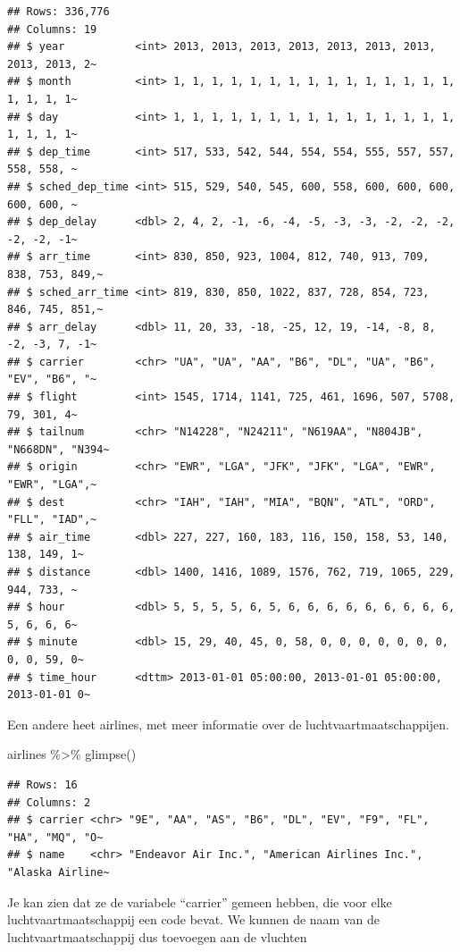 \documentclass[]{tufte-book}
\newenvironment{Shaded}{}{}
\newcommand{\FunctionTok}[1]{\textcolor[rgb]{0.02,0.16,0.49}{#1}}
\newcommand{\NormalTok}[1]{#1}
\newcommand{\SpecialCharTok}[1]{\textcolor[rgb]{0.25,0.44,0.63}{#1}}
\begin{document}
\begin{verbatim}
## Rows: 336,776
## Columns: 19
## $ year           <int> 2013, 2013, 2013, 2013, 2013, 2013, 2013, 2013, 2013, 2~
## $ month          <int> 1, 1, 1, 1, 1, 1, 1, 1, 1, 1, 1, 1, 1, 1, 1, 1, 1, 1, 1~
## $ day            <int> 1, 1, 1, 1, 1, 1, 1, 1, 1, 1, 1, 1, 1, 1, 1, 1, 1, 1, 1~
## $ dep_time       <int> 517, 533, 542, 544, 554, 554, 555, 557, 557, 558, 558, ~
## $ sched_dep_time <int> 515, 529, 540, 545, 600, 558, 600, 600, 600, 600, 600, ~
## $ dep_delay      <dbl> 2, 4, 2, -1, -6, -4, -5, -3, -3, -2, -2, -2, -2, -2, -1~
## $ arr_time       <int> 830, 850, 923, 1004, 812, 740, 913, 709, 838, 753, 849,~
## $ sched_arr_time <int> 819, 830, 850, 1022, 837, 728, 854, 723, 846, 745, 851,~
## $ arr_delay      <dbl> 11, 20, 33, -18, -25, 12, 19, -14, -8, 8, -2, -3, 7, -1~
## $ carrier        <chr> "UA", "UA", "AA", "B6", "DL", "UA", "B6", "EV", "B6", "~
## $ flight         <int> 1545, 1714, 1141, 725, 461, 1696, 507, 5708, 79, 301, 4~
## $ tailnum        <chr> "N14228", "N24211", "N619AA", "N804JB", "N668DN", "N394~
## $ origin         <chr> "EWR", "LGA", "JFK", "JFK", "LGA", "EWR", "EWR", "LGA",~
## $ dest           <chr> "IAH", "IAH", "MIA", "BQN", "ATL", "ORD", "FLL", "IAD",~
## $ air_time       <dbl> 227, 227, 160, 183, 116, 150, 158, 53, 140, 138, 149, 1~
## $ distance       <dbl> 1400, 1416, 1089, 1576, 762, 719, 1065, 229, 944, 733, ~
## $ hour           <dbl> 5, 5, 5, 5, 6, 5, 6, 6, 6, 6, 6, 6, 6, 6, 6, 5, 6, 6, 6~
## $ minute         <dbl> 15, 29, 40, 45, 0, 58, 0, 0, 0, 0, 0, 0, 0, 0, 0, 59, 0~
## $ time_hour      <dttm> 2013-01-01 05:00:00, 2013-01-01 05:00:00, 2013-01-01 0~
\end{verbatim}

Een andere heet airlines, met meer informatie over de luchtvaartmaatschappijen.

\begin{Shaded}
\begin{Highlighting}[]
\NormalTok{airlines }\SpecialCharTok{\%\textgreater{}\%}
  \FunctionTok{glimpse}\NormalTok{()}
\end{Highlighting}
\end{Shaded}

\begin{verbatim}
## Rows: 16
## Columns: 2
## $ carrier <chr> "9E", "AA", "AS", "B6", "DL", "EV", "F9", "FL", "HA", "MQ", "O~
## $ name    <chr> "Endeavor Air Inc.", "American Airlines Inc.", "Alaska Airline~
\end{verbatim}

Je kan zien dat ze de variabele ``carrier'' gemeen hebben, die voor elke luchtvaartmaatschappij een code bevat. We kunnen de naam van de luchtvaartmaatschappij dus toevoegen aan de vluchten
\end{document}
